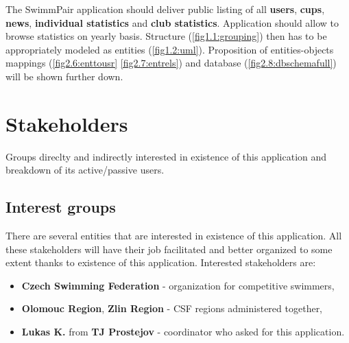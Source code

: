 The SwimmPair application should deliver public listing of all \textbf{users}, \textbf{cups}, \textbf{news}, \textbf{individual statistics} and \textbf{club statistics}. Application should allow to browse statistics on yearly basis. Structure (\autoref{fig1.1:grouping}) then has to be appropriately modeled as entities (\autoref{fig1.2:uml}). Proposition of entities-objects mappings (\autoref{fig2.6:enttousr} \autoref{fig2.7:entrels}) and database (\autoref{fig2.8:dbschemafull}) will be shown further down. 
\section{Stakeholders}
Groups direclty and indirectly interested in existence of this application and breakdown of its active/passive users.
\subsection*{Interest groups}
There are several entities that are interested in existence of this application. All these stakeholders will have their job facilitated and better organized to some extent thanks to existence of this application.
\newline
Interested stakeholders are:
\begin{itemize}
  \item \textbf{Czech Swimming Federation} - organization for competitive swimmers,
  \item \textbf{Olomouc Region}, \textbf{Zlin Region} - CSF regions administered together,
  \item \textbf{Lukas K.} from \textbf{TJ Prostejov} - coordinator who asked for this application.
\end{itemize}
